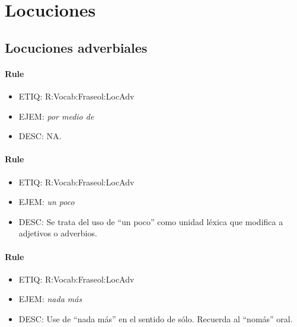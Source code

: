 \documentclass[11pt]{report}
\begin{document}
\section{Locuciones}
\subsection{Locuciones adverbiales}
\paragraph*{Rule}
\begin{itemize}
\item ETIQ: R:Vocab:Fraseol:LocAdv
\item EJEM: \emph{por medio de}  
\item DESC: NA.
\end{itemize}

\paragraph*{Rule}
\begin{itemize}
\item ETIQ: R:Vocab:Fraseol:LocAdv
\item EJEM: \emph{un poco}  
\item DESC: Se trata del uso de ``un poco'' como unidad léxica que modifica a adjetivos o adverbios.
\end{itemize}

\paragraph*{Rule}
\begin{itemize}
\item ETIQ: R:Vocab:Fraseol:LocAdv
\item EJEM: \emph{nada más}  
\item DESC: Use de ``nada más'' en el sentido de sólo. Recuerda al ``nomás'' oral.
\end{itemize}
\end{document}
